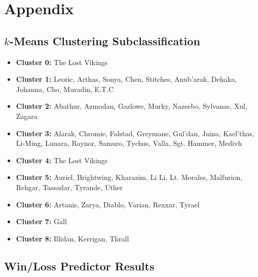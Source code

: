 \documentclass[11pt,letterpaper]{article}
\begin{document}
\section*{Appendix}

\subsection*{$k$-Means Clustering Subclassification}

\begin{itemize}
\item \textbf{Cluster 0:} The Lost Vikings
\item \textbf{Cluster 1:} Leoric, Arthas, Sonya, Chen, Stitches, Anub'arak, Dehaka, Johanna, Cho, Muradin, E.T.C 
\item \textbf{Cluster 2:} Abathur, Azmodan, Gazlowe, Murky, Nazeebo, Sylvanas, Xul, Zagara
\item \textbf{Cluster 3:} Alarak, Chromie, Falstad, Greymane, Gul'dan, Jaina, Kael'thas, Li-Ming, Lunara, Raynor, Samuro, Tychus, Valla, Sgt. Hammer, Medivh
\item \textbf{Cluster 4:} The Lost Vikings
\item \textbf{Cluster 5:} Auriel, Brightwing, Kharazim, Li Li, Lt. Morales, Malfurion, Rehgar, Tassadar, Tyrande, Uther
\item \textbf{Cluster 6:} Artanis, Zarya, Diablo, Varian, Rexxar, Tyrael
\item \textbf{Cluster 7:} Gall
\item \textbf{Cluster 8:} Illidan, Kerrigan, Thrall
\end{itemize}

\subsection*{Win/Loss Predictor Results}
\end{document}
